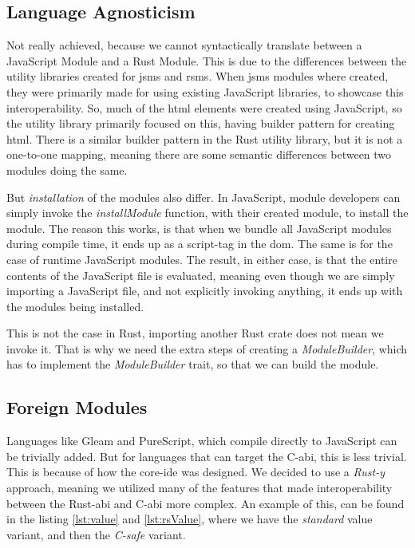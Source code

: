 \subsection{Language Agnosticism}

Not really achieved, because we cannot syntactically translate between a
JavaScript Module and a Rust Module. This is due to the differences between the
utility libraries created for \gls{jsms} and \gls{rsms}. When \gls{jsms} modules
where created, they were primarily made for using existing JavaScript libraries,
to showcase this interoperability. So, much of the \gls{html} elements were
created using JavaScript, so the utility library primarily focused on this,
having builder pattern for creating \gls{html}. There is a similar builder
pattern in the Rust utility library, but it is not a one-to-one mapping, meaning
there are some semantic differences between two modules doing the same.

But \textit{installation} of the modules also differ. In JavaScript, module
developers can simply invoke the \textit{installModule} function, with their
created module, to install the module. The reason this works, is that when we
bundle all JavaScript modules during compile time, it ends up as a script-tag in
the \gls{dom}. The same is for the case of runtime JavaScript modules. The
result, in either case, is that the entire contents of the JavaScript file is
evaluated, meaning even though we are simply importing a JavaScript file, and
not explicitly invoking anything, it ends up with the modules being installed.

This is not the case in Rust, importing another Rust crate does not mean we
invoke it. That is why we need the extra steps of creating a
\textit{ModuleBuilder}, which has to implement the \textit{ModuleBuilder} trait,
so that we can build the module.

\subsection{Foreign Modules}

Languages like Gleam and PureScript, which compile directly to JavaScript can
be trivially added. But for languages that can target the C-\gls{abi}, this is
less trivial. This is because of how the core-\gls{ide} was designed. We decided
to use a \textit{Rust-y} approach, meaning we utilized many of the features that
made interoperability between the Rust-\gls{abi} and C-\gls{abi} more complex.
An example of this, can be found in the listing \ref{lst:value} and
\ref{lst:rsValue}, where we have the \textit{standard} value variant, and then
the \textit{C-safe} variant.

